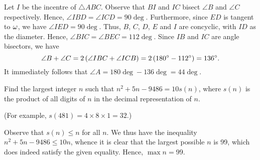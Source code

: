 \begin{center}
\end{center}
\begin{solution*}
    Let $I$ be the incentre of $\triangle ABC$. Observe that $BI$ and $IC$ bisect $\angle B$ and $\angle C$ respectively. Hence, $\angle IBD = \angle ICD = 90\deg$. Furthermore, since $ED$ is tangent to $\omega$, we have $\angle IED = 90\deg$. Thus, $B$, $C$, $D$, $E$ and $I$ are concyclic, with $ID$ as the diameter. Hence, $\angle BIC = \angle BEC = 112\deg$. Since $IB$ and $IC$ are angle bisectors, we have \[\angle B + \angle C = 2 \left( \angle IBC + \angle ICB \right) = 2 \left( 180^{\circ} - 112^{\circ} \right) = 136^{\circ}.\] It immediately follows that $\angle A = 180\deg - 136\deg = 44\deg$.
\end{solution*}

\begin{question}[99]\label{Q::2022-O-1-16}
    Find the largest integer $n$ such that $n^2 + 5n - 9486 = 10s(n)$, where $s(n)$ is the product of all digits of $n$ in the decimal representation of $n$.
    
    \noindent (For example, $s(481) = 4 \times 8 \times 1 = 32.$)
\end{question}
\begin{solution*}
    Observe that $s(n) \leq n$ for all $n$. We thus have the inequality $n^2 + 5n - 9486 \leq 10 n$, whence it is clear that the largest possible $n$ is 99, which does indeed satisfy the given equality. Hence, $\max n = 99$.
\end{solution*}

